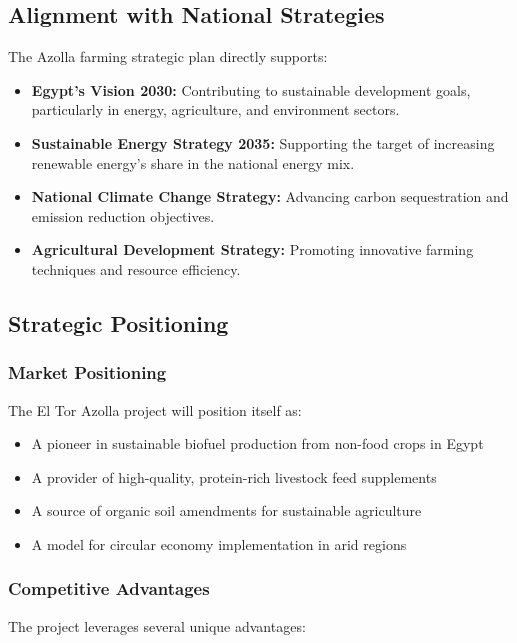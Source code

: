 \subsection{Alignment with National Strategies}

The Azolla farming strategic plan directly supports:

\begin{itemize}
    \item \textbf{Egypt's Vision 2030:} Contributing to sustainable development goals, particularly in energy, agriculture, and environment sectors.
    
    \item \textbf{Sustainable Energy Strategy 2035:} Supporting the target of increasing renewable energy's share in the national energy mix.
    
    \item \textbf{National Climate Change Strategy:} Advancing carbon sequestration and emission reduction objectives.
    
    \item \textbf{Agricultural Development Strategy:} Promoting innovative farming techniques and resource efficiency.
\end{itemize}

\subsection{Strategic Positioning}

\subsubsection{Market Positioning}
The El Tor Azolla project will position itself as:

\begin{itemize}
    \item A pioneer in sustainable biofuel production from non-food crops in Egypt
    \item A provider of high-quality, protein-rich livestock feed supplements
    \item A source of organic soil amendments for sustainable agriculture
    \item A model for circular economy implementation in arid regions
\end{itemize}

\subsubsection{Competitive Advantages}
The project leverages several unique advantages:

